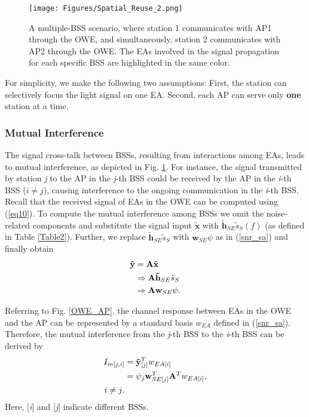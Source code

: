 \begin{figure}
\centering
\texttt{[image: Figures/Spatial\_Reuse\_2.png]}
\caption{A multiple-BSS scenario, where station 1 communicates with AP1 through the OWE, and simultaneously, station 2 communicates with AP2 through the OWE. The EAs involved in the signal propagation for each specific BSS are highlighted in the same color.}
\label{spatial_reuse}
\vspace{-0.5cm}
\end{figure}

\par
For simplicity, we make the following two assumptions: First, the station can selectively focus the light signal on one EA.
Second, each AP can serve only \textbf{one} station at a time.

\subsubsection{Mutual Interference}
The signal cross-talk between BSSs, resulting from interactions among EAs, leads to mutual interference, as depicted in Fig. \ref{spatial_reuse}. For instance, the signal transmitted by station \textit{j} to the AP in the \textit{j}-th BSS could be received by the AP in the \textit{i}-th BSS ($i\neq j$), causing interference to the ongoing communication in the \textit{i}-th BSS. Recall that the received signal of EAs in the OWE can be computed using (\ref{eq10}). To compute the mutual interference among BSSs we omit the noise-related components and substitute the signal input $\mathbf{\tilde{x}}$ with ${\mathbf{\tilde{h}}_{SE}}{\tilde{s}_{S}}(f)$ (as defined in Table \ref{Table2}). Further, we replace ${{\mathbf{\tilde h}}_{SE}}{{\tilde s}_{S}}$ with $\mathbf{w}_{SE} \psi$ as in (\ref{snr_sa}) and finally obtain
\begin{equation}
\begin{aligned}
    \mathbf{\tilde y} & = \mathbf{A}\mathbf{\tilde x} \\
    & \Rightarrow \mathbf{A} {{\mathbf{\tilde h}}_{SE}}{{{\tilde s}_{S}}} \\
    & \Rightarrow \mathbf{A}{{\bf{w}}_{SE}}\psi \text{.}
\end{aligned}
\end{equation}
\par
Referring to Fig. \ref{OWE_AP}, the channel response between EAs in the OWE and the AP can be represented by a standard basis $w_{EA}$ defined in (\ref{snr_sa}). Therefore, the mutual interference from the \textit{j}-th BSS to the \textit{i}-th BSS can be derived by
\begin{equation}
\label{mutual_interference}
\begin{aligned}
I_{m[j,i]}&=\mathbf{\tilde y}_{[j]}^T w_{EA[i]}\\
&=\psi_j{{\bf{w}}_{SE[j]}^T}\mathbf{A}^Tw_{EA[i]} \text{,} \\
i\neq j \text{.}
\end{aligned}
\end{equation}
Here, [\textit{i}] and [\textit{j}] indicate different BSSs.

